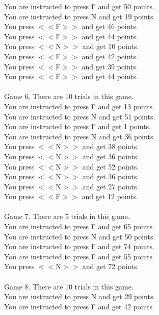 \documentclass[pdflatex,sn-nature]{sn-jnl}%
\theoremstyle{thmstyleone}%
\theoremstyle{thmstyletwo}%
\theoremstyle{thmstylethree}%
\begin{document}
You are instructed to press F and get 50 points. $~$\\ 
You are instructed to press N and get 19 points. $~$\\ 
You press $<<$F$>>$ and get 46 points. $~$\\ 
You press $<<$F$>>$ and get 44 points. $~$\\ 
You press $<<$N$>>$ and get 10 points. $~$\\ 
You press $<<$F$>>$ and get 42 points. $~$\\ 
You press $<<$F$>>$ and get 39 points. $~$\\ 
You press $<<$F$>>$ and get 44 points. $~$\\ 
 $~$\\ 
Game 6. There are 10 trials in this game. $~$\\ 
You are instructed to press F and get 13 points. $~$\\ 
You are instructed to press N and get 51 points. $~$\\ 
You are instructed to press F and get 1 points. $~$\\ 
You are instructed to press N and get 36 points. $~$\\ 
You press $<<$N$>>$ and get 38 points. $~$\\ 
You press $<<$N$>>$ and get 36 points. $~$\\ 
You press $<<$N$>>$ and get 52 points. $~$\\ 
You press $<<$N$>>$ and get 36 points. $~$\\ 
You press $<<$N$>>$ and get 27 points. $~$\\ 
You press $<<$F$>>$ and get 12 points. $~$\\ 
 $~$\\ 
Game 7. There are 5 trials in this game. $~$\\ 
You are instructed to press F and get 65 points. $~$\\ 
You are instructed to press N and get 50 points. $~$\\ 
You are instructed to press F and get 74 points. $~$\\ 
You are instructed to press F and get 55 points. $~$\\ 
You press $<<$N$>>$ and get 72 points. $~$\\ 
 $~$\\ 
Game 8. There are 10 trials in this game. $~$\\ 
You are instructed to press N and get 29 points. $~$\\ 
You are instructed to press F and get 42 points. $~$\\ 
\end{document}
